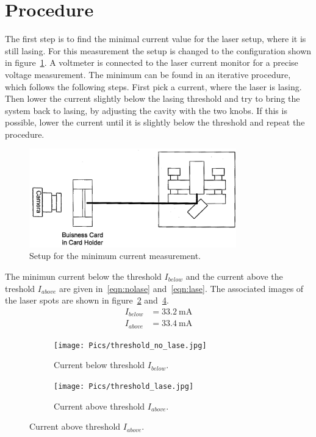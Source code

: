 \vspace{-15pt}
\section{Procedure}
\label{sec:Procedure}

The first step is to find the minimal current value for the laser setup, where
it is still lasing. For this measurement the setup is changed to the configuration shown in
figure~\ref{fig:setup_current}. A voltmeter is connected to the laser current
monitor for a precise voltage measurement.
The minimum can be found in an iterative procedure, which follows the following
steps. First pick a current, where the laser is lasing.
Then lower the current slightly below the lasing threshold and try to bring the system back to lasing,
by adjusting the cavity with the two knobs.
If this is possible, lower the current
until it is slightly below the threshold and repeat the procedure.

\begin{figure}
  \vspace{-10pt}
  \centering
  \includegraphics[width=0.8\textwidth]{Pics/setup_threshold.png}
  \caption{Setup for the minimum current measurement.\cite{anleitung}}
  \label{fig:setup_current}
\end{figure}

The minimun current below the threshold $I_{below}$ and the current above the treshold $I_{above}$
are given in~\eqref{eqn:nolase} and~\eqref{eqn:lase}.
The associated images of the laser spots are shown in figure~\ref{fig:no_lase}
and~\ref{fig:lase}.
\vspace{-10pt}
\begin{align}
  \label{eqn:nolase}
  I_{below} &= \SI{33.2}{\milli\ampere}\\
  \label{eqn:lase}
  I_{above} &= \SI{33.4}{\milli\ampere}
\end{align}

\begin{figure}[h!]
  \centering
  \begin{subfigure}{0.48\textwidth}
    \centering
    \texttt{[image: Pics/threshold\_no\_lase.jpg]}
    \caption{Current below threshold $I_{below}$.}
    \label{fig:no_lase}
  \end{subfigure}
  \begin{subfigure}{0.48\textwidth}
    \centering
    \texttt{[image: Pics/threshold\_lase.jpg]}
    \caption{Current above threshold $I_{above}$.}
    \label{fig:lase}
  \end{subfigure}
\end{figure}
\FloatBarrier

